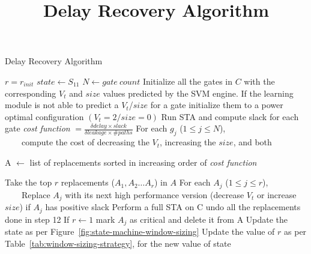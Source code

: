\begin{algorithm}
  \scriptsize
\LinesNumbered
\title{Delay Recovery Algorithm}
\caption{Delay Recovery Algorithm }
\label{alg:delay}
 $r = r_{init}$\; 
  $state\leftarrow S_{11}$\;
 $N \leftarrow gate\ count$\; 
    Initialize all the gates in $C$ with the corresponding $V_t$ and $size$ values predicted by the SVM engine. If the learning module is not able to predict a $V_t$/$size$ for a gate initialize them to a power optimal configuration $(V_t=2/size=0)$\; 
  Run STA and compute slack for each gate\; 
    \textit{cost function } $=\frac{\delta delay \times slack}{\delta leakage \times \# paths} $\; 
    For each $g_{j}$ ($1 \le j \le N$),\\ \ \ \ \  compute the cost of decreasing the $V_t$, increasing the $size$, and both\; 

 A $\leftarrow$ list of replacements sorted in increasing order of \textit{cost function}\;  
    {
    Take the top $r$ replacements ($A_{1}, A_{2} \ldots A_{r}$) in $A$ \; 
     For each $A_{j}$ ($1 \le j \le r$),\\ \ \ \ \ Replace $A_{j}$ with its next high performance version (decrease $V_t$ or increase $size$) if $A_{j}$ has positive slack\; 
      Perform a full STA on C\; 
       {undo all the replacements done in step 12\;
    If $r \leftarrow 1$ mark $A_{j}$ as critical and delete it from A\;
      Update the state as per Figure~\ref{fig:state-machine-window-sizing}\; 
      Update the value of $r$ as per Table~\ref{tab:window-sizing-strategy}, for the new value of state\; 
    }

    }
\end{algorithm}




